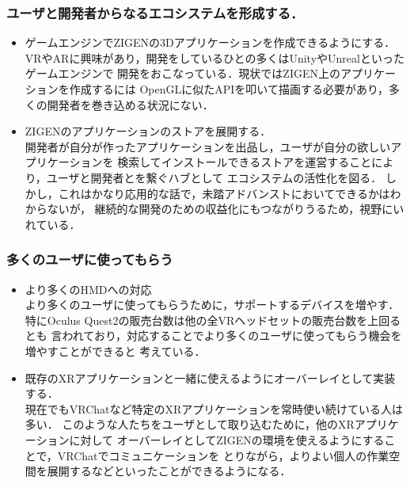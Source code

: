 \subsubsection*{ユーザと開発者からなるエコシステムを形成する．}

\begin{itemize}
  \item ゲームエンジンでZIGENの3Dアプリケーションを作成できるようにする．\\
        VRやARに興味があり，開発をしているひとの多くはUnityやUnrealといったゲームエンジンで
        開発をおこなっている．現状ではZIGEN上のアプリケーションを作成するには
        OpenGLに似たAPIを叩いて描画する必要があり，多くの開発者を巻き込める状況にない．

  \item ZIGENのアプリケーションのストアを展開する．\\
        開発者が自分が作ったアプリケーションを出品し，ユーザが自分の欲しいアプリケーションを
        検索してインストールできるストアを運営することにより，ユーザと開発者とを繋ぐハブとして
        エコシステムの活性化を図る．
        しかし，これはかなり応用的な話で，未踏アドバンストにおいてできるかはわからないが，
        継続的な開発のための収益化にもつながりうるため，視野にいれている．
\end{itemize}

\subsubsection*{多くのユーザに使ってもらう}

\begin{itemize}
  \item より多くのHMDへの対応\\
        より多くのユーザに使ってもらうために，サポートするデバイスを増やす．
        特にOculus Quest2の販売台数は他の全VRヘッドセットの販売台数を上回るとも
        言われており，対応することでより多くのユーザに使ってもらう機会を増やすことができると
        考えている．

  \item 既存のXRアプリケーションと一緒に使えるようにオーバーレイとして実装する．\\
        現在でもVRChatなど特定のXRアプリケーションを常時使い続けている人は多い．
        このような人たちをユーザとして取り込むために，他のXRアプリケーションに対して
        オーバーレイとしてZIGENの環境を使えるようにすることで，VRChatでコミュニケーションを
        とりながら，よりよい個人の作業空間を展開するなどといったことができるようになる．
\end{itemize}

